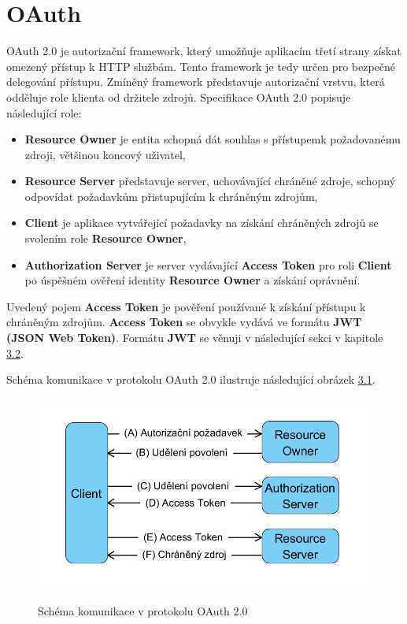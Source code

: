 \documentclass[
  printed, %
  twoside, %
  table,   %
  nolof,     %
  nolot,     %
]{fithesis3}
\begin{document}
\section{OAuth}
\label{sec:oauth}
OAuth 2.0 \cite{rfc6749} je autorizační framework, který umožňuje aplikacím třetí strany získat omezený přístup k HTTP službám. Tento framework je tedy určen pro bezpečné delegování přístupu. Zmíněný framework představuje autorizační vrstvu, která odděluje role klienta od držitele zdrojů. Specifikace OAuth 2.0 popisuje následující role: 
\begin{itemize}
    \item \textbf{Resource Owner} je entita schopná dát souhlas s přístupem\break k požadovanému zdroji, většinou koncový uživatel,
    \item \textbf{Resource Server} představuje server, uchovávající chráněné zdroje, schopný odpovídat požadavkům přistupujícím k chráněným zdrojům,
    \item \textbf{Client} je aplikace vytvářející požadavky na získání chráněných zdrojů se svolením role \textbf{Resource Owner},
    \item \textbf{Authorization Server} je server vydávající \textbf{Access Token} pro roli \textbf{Client} po úspěšném ověření identity \textbf{Resource Owner} a získání oprávnění.
\end{itemize}
Uvedený pojem \textbf{Access Token} je pověření používané k získání přístupu k chráněným zdrojům. \textbf{Access Token} se obvykle vydává ve formátu \textbf{JWT (JSON Web Token)}. Formátu \textbf{JWT} se věnuji v následující sekci v kapitole \hyperref[sec:oidc]{3.2}.  \par
\clearpage
Schéma komunikace v protokolu OAuth 2.0 ilustruje následující obrázek \hyperref[fig:oauth]{3.1}. 

\begin{figure}[H]
\caption{Schéma komunikace v protokolu OAuth 2.0}
\centering
\includegraphics[width=12.8cm]{pics/diplomkaOauth} 
\label{fig:oauth}
\end{figure}
\par 
\end{document}
